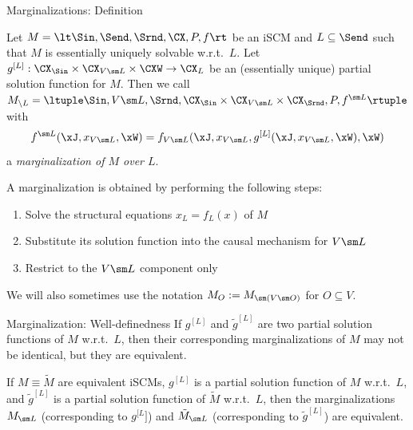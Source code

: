 \begin{frame}{Marginalizations: Definition}
  \begin{Def}[\ref{def:scm_marginalization}]
  Let $M = \lt \Sin, \Send, \Srnd, \CX, P, f \rt$ be an iSCM and $L \subseteq \Send$ such that $M$ is essentially uniquely solvable w.r.t.\ $L$.
  Let $g^{[L]} : \CX_{\Sin} \times \CX_{V \sm L} \times \CXW \to \CX_L$ be an (essentially unique) partial solution function for $M$.
  Then we call $M_{\setminus L} = \ltuple \Sin, V \sm L, \Srnd, \CX_{\Sin} \times \CX_{V \sm L} \times \CX_{\Srnd}, P, f^{\sm L} \rtuple$ with
    $$f^{\sm L}(\xJ,x_{V \sm L},\xW) = f_{V \sm L}(\xJ,x_{V \sm L},g^{[L]}(\xJ,x_{V \sm L},\xW),\xW)$$
  a \emph{marginalization of $M$ over $L$}.
\end{Def}
A marginalization is obtained by performing the following steps:
  \begin{enumerate}
    \item Solve the structural equations $x_L = f_L(x)$ of $M$ 
    \item Substitute its solution function into the causal mechanism for $V \sm L$
    \item Restrict to the $V \sm L$ component only
  \end{enumerate}
  \begin{Not}[\ref{not:scm_marginalization}]
  We will also sometimes use the notation $M_O := M_{\sm (V \sm O)}$ for $O \subseteq V$.
\end{Not}
\end{frame}

\begin{frame}{Marginalization: Well-definedness}
If $g^{[L]}$ and $\tilde g^{[L]}$ are two partial solution functions of $M$ w.r.t.\ $L$, then their corresponding marginalizations of $M$ may not be identical, but they are equivalent.
  \begin{Prp}[\ref{prp:scm_marginalization_equivalence}]
  If $M \equiv \tilde{M}$ are equivalent iSCMs, $g^{[L]}$ is a partial solution function of $M$ w.r.t.\ $L$, and $\tilde g^{[L]}$ is a partial solution function of $\tilde{M}$ w.r.t.\ $L$, then the marginalizations $M_{\sm L}$ (corresponding to $g^{[L}]$) and $\tilde{M}_{\sm L}$ (corresponding to $\tilde g^{[L]}$) are equivalent.
\end{Prp}
\end{frame}

